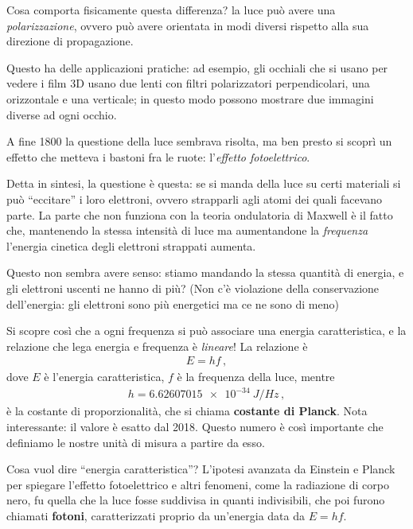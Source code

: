 \documentclass{article}
\begin{document}
Cosa comporta fisicamente questa differenza? la luce può avere una \emph{polarizzazione}, ovvero può avere orientata in modi diversi rispetto alla sua direzione di propagazione. 


Questo ha delle applicazioni pratiche: ad esempio, gli occhiali che si usano per vedere i film 3D usano due lenti con filtri polarizzatori perpendicolari, una orizzontale e una verticale; in questo modo possono mostrare due immagini diverse ad ogni occhio.


A fine 1800 la questione della luce sembrava risolta, ma ben presto si scoprì un effetto che metteva i bastoni fra le ruote: l'\emph{effetto fotoelettrico}.

Detta in sintesi, la questione è questa: se si manda della luce su certi materiali si può ``eccitare'' i loro elettroni, ovvero strapparli agli atomi dei quali facevano parte.
La parte che non funziona con la teoria ondulatoria di Maxwell è il fatto che, mantenendo la stessa intensità di luce ma aumentandone la \emph{frequenza} l'energia cinetica degli elettroni strappati aumenta. 

Questo non sembra avere senso: stiamo mandando la stessa quantità di energia, e gli elettroni uscenti ne hanno di più? 
(Non c'è violazione della conservazione dell'energia: gli elettroni sono più energetici ma ce ne sono di meno)

Si scopre così che a ogni frequenza si può associare una energia caratteristica, e la relazione che lega energia e frequenza è \emph{lineare}! La relazione è 
%
\begin{align}
E = h f
\,,
\end{align}
%
dove \(E\) è l'energia caratteristica, \(f\) è la frequenza della luce, mentre 
%
\begin{align}
h = \SI{6.62607015e-34}{J / Hz}
\,,
\end{align}
%
è la costante di proporzionalità, che si chiama \textbf{costante di Planck}. 
Nota interessante: il valore è esatto dal 2018. Questo numero è così importante che definiamo le nostre unità di misura a partire da esso.

Cosa vuol dire ``energia caratteristica''? 
L'ipotesi avanzata da Einstein e Planck per spiegare l'effetto fotoelettrico e altri fenomeni, come la radiazione di corpo nero, fu quella che la luce fosse suddivisa in quanti indivisibili, che poi furono chiamati \textbf{fotoni}, caratterizzati proprio da un'energia data da \(E = hf\). 
\end{document}
